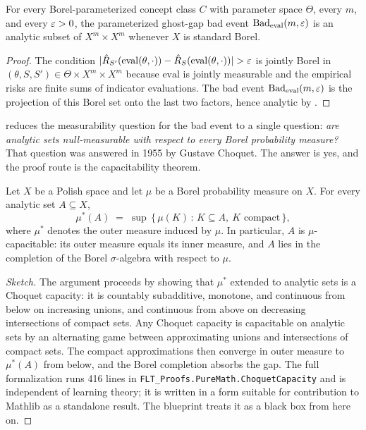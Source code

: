 \begin{cor}
\label{cor:param-bad-analytic}
For every Borel-parameterized concept class $C$ with parameter space
$\Theta$, every $m$, and every $\varepsilon > 0$, the parameterized ghost-gap
bad event $\mathrm{Bad}_{\mathrm{eval}}(m, \varepsilon)$ is an analytic
subset of $X^m \times X^m$ whenever $X$ is standard Borel.
\end{cor}

\begin{proof}
The condition
$|\hat{R}_{S'}(\mathrm{eval}(\theta,\cdot))
  - \hat{R}_S(\mathrm{eval}(\theta,\cdot))| > \varepsilon$
is jointly Borel in $(\theta, S, S') \in \Theta \times X^m \times X^m$
because $\mathrm{eval}$ is jointly measurable and the empirical risks
are finite sums of indicator evaluations. The bad event
$\mathrm{Bad}_{\mathrm{eval}}(m, \varepsilon)$ is the projection of this
Borel set onto the last two factors, hence analytic by
.
\end{proof}

 reduces the measurability question for
the bad event to a single question: \emph{are analytic sets
null-measurable with respect to every Borel probability measure?}
That question was answered in 1955 by Gustave Choquet. The answer is
yes, and the proof route is the capacitability theorem.

\begin{thm}
\label{thm:choquet-capacity}
  \leanok
Let $X$ be a Polish space and let $\mu$ be a Borel probability
measure on $X$. For every analytic set $A \subseteq X$,
\[
  \mu^*(A) \;=\; \sup\,\bigl\{\, \mu(K)\,:\,K \subseteq A,\ K\text{ compact}\,\bigr\},
\]
where $\mu^*$ denotes the outer measure induced by $\mu$. In
particular, $A$ is $\mu$-capacitable: its outer measure equals its
inner measure, and $A$ lies in the completion of the Borel
$\sigma$-algebra with respect to $\mu$.
\end{thm}

\begin{proof}[Sketch]
The argument proceeds by showing that $\mu^*$ extended to analytic
sets is a Choquet capacity: it is countably subadditive, monotone,
and continuous from below on increasing unions, and continuous from
above on decreasing intersections of compact sets. Any Choquet
capacity is capacitable on analytic sets by an alternating game
between approximating unions and intersections of compact sets. The
compact approximations then converge in outer measure to $\mu^*(A)$
from below, and the Borel completion absorbs the gap.
The full formalization runs 416 lines in
\texttt{FLT\_Proofs.PureMath.ChoquetCapacity} and is independent of
learning theory; it is written in a form suitable for contribution to
Mathlib as a standalone result. The blueprint treats it as a black
box from here on.
\end{proof}

